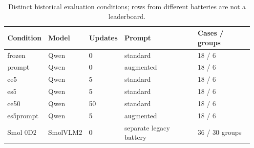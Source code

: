 \begin{table}[t]
\centering\small
\caption{Distinct historical evaluation conditions; rows from different batteries are not a leaderboard.}
\label{tab:t1_evaluation_conditions}
\begin{tabularx}{\linewidth}{lXXXX}
\toprule
Condition & Model & Updates & Prompt & Cases / groups \\ \midrule
frozen & Qwen & 0 & standard & 18 / 6 \\
prompt & Qwen & 0 & augmented & 18 / 6 \\
ce5 & Qwen & 5 & standard & 18 / 6 \\
es5 & Qwen & 5 & standard & 18 / 6 \\
ce50 & Qwen & 50 & standard & 18 / 6 \\
es5prompt & Qwen & 5 & augmented & 18 / 6 \\
Smol 0D2 & SmolVLM2 & 0 & separate legacy battery & 36 / 30 groups \\
\bottomrule
\end{tabularx}
\end{table}
